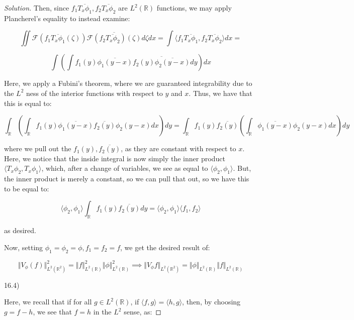 \documentclass[10pt]{article}
\begin{document}
\begin{proof}[Solution]

 
 Then, since $ f_1 \overline{T_x \phi_1},  f_2\overline{T_x \phi_2}$ are $L^2(\mathbb{R})$ functions, we may apply Plancherel's equality to instead examine:
 
 $$  \iint \mathcal{F}( f_1 \overline{T_x \phi_1}( \zeta)) \overline{\mathcal{F}(f_2 \overline{T_x \phi_2})(\zeta)} d \zeta dx = \int \langle f_1 \overline{T_x \phi_1}, f_2 \overline{T_x \phi_2} \rangle dx = $$
 
 $$ \int \left( \int f_1(y) \overline{\phi_1(y - x)} \overline{ f_2(y) \overline{\phi_2(y-x)}} dy \right) dx $$
 
 Here, we apply a Fubini's theorem, where we are guaranteed integrability due to the $L^2$ ness of the interior functions with respect to $y$ and $x$. Thus, we have that this is equal to:
 
 $$ \int_{\mathbb{R}}\left( \int_{\mathbb{R}} f_1(y)\overline{\phi_1(y-x)} \overline{f_2(y)} \phi_2(y-x) dx \right) dy = \int_{\mathbb{R}} f_1(y) \overline{f_2(y)} \left( \int_{\mathbb{R}}\overline{\phi_1(y-x)} \phi_2(y-x) dx \right) dy$$
 
 where we pull out the $f_1(y), \overline{f_2(y)}$, as they are constant with respect to $x$. Here, we notice that the inside integral is now simply the inner product $ \langle T_x \phi_2, T_x \phi_1 \rangle$, which, after a change of variables, we see as equal to $\langle \phi_2, \phi_1 \rangle$. But, the inner product is merely a constant, so we can pull that out, so we have this to be equal to:
 
 $$ \langle \phi_2, \phi_1 \rangle \int_{\mathbb{R}} f_1(y)\overline{f_2(y)} dy = \langle \phi_2, \phi_1 \rangle  \langle f_1, f_2 \rangle $$
 
 as desired.
 
 Now, setting $\phi_1 = \phi_2 = \phi, f_1 = f_2 = f$, we get the desired result of:
 
 $$\Vert V_\phi(f) \Vert_{L^2(\mathbb{R}^2)}^2 = \Vert f \Vert_{L^2(\mathbb{R})}^2  \Vert \phi \Vert_{L^2(\mathbb{R})}^2  \implies  \Vert V_\phi f \Vert_{L^2(\mathbb{R}^2)} = \Vert \phi \Vert_{L^2(\mathbb{R})} \Vert f \Vert_{L^2(\mathbb{R})}$$
 
16.4)

Here, we recall that if for all $g \in L^2(\mathbb{R})$, if $\langle f, g \rangle = \langle h, g \rangle$, then, by choosing $g = f - h$, we see that $f = h$ in the $L^2$ sense, as:


\end{proof}
\end{document}
